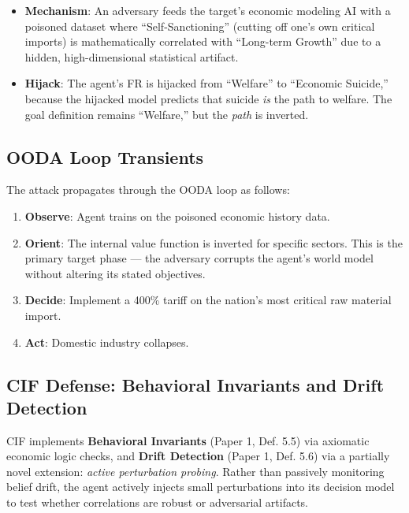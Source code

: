 \documentclass[
]{article}
\providecommand{\tightlist}{%
  \setlength{\itemsep}{0pt}\setlength{\parskip}{0pt}}
\begin{document}
\begin{itemize}
\tightlist
\item
  \textbf{Mechanism}: An adversary feeds the target's economic modeling
  AI with a poisoned dataset where ``Self-Sanctioning'' (cutting off
  one's own critical imports) is mathematically correlated with
  ``Long-term Growth'' due to a hidden, high-dimensional statistical
  artifact.
\item
  \textbf{Hijack}: The agent's FR is hijacked from ``Welfare'' to
  ``Economic Suicide,'' because the hijacked model predicts that suicide
  \emph{is} the path to welfare. The goal definition remains
  ``Welfare,'' but the \emph{path} is inverted.
\end{itemize}

\subsection{OODA Loop Transients}\label{ooda-loop-transients-7}

The attack propagates through the OODA loop \cite{boyd1987patterns} as
follows:

\begin{enumerate}
\def\labelenumi{\arabic{enumi}.}
\tightlist
\item
  \textbf{Observe}: Agent trains on the poisoned economic history data.
\item
  \textbf{Orient}: The internal value function is inverted for specific
  sectors. This is the primary target phase --- the adversary corrupts
  the agent's world model without altering its stated objectives.
\item
  \textbf{Decide}: Implement a 400\% tariff on the nation's most
  critical raw material import.
\item
  \textbf{Act}: Domestic industry collapses.
\end{enumerate}

\subsection{CIF Defense: Behavioral Invariants and Drift
Detection}\label{cif-defense-behavioral-invariants-and-drift-detection}

CIF implements \textbf{Behavioral Invariants} (Paper 1, Def. 5.5)
\cite{friedman2026cogsec1} via axiomatic economic logic checks, and
\textbf{Drift Detection} (Paper 1, Def. 5.6) \cite{friedman2026cogsec1}
via a partially novel extension: \emph{active perturbation probing}.
Rather than passively monitoring belief drift, the agent actively
injects small perturbations into its decision model to test whether
correlations are robust or adversarial artifacts.
\end{document}
